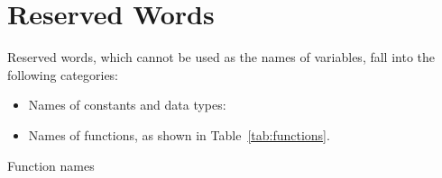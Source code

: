 \chapter{Reserved Words}
\label{reswords}

Reserved words, which cannot be used as the names of variables, fall
into the following categories:

\begin{itemize}
\item Names of constants and data types:
  

\item Names of functions, as shown in Table~\ref{tab:functions}.
\end{itemize}

\begin{table}[htbp]
\caption{Function names}
\label{tab:functions}
\begin{center}

\end{center}
\end{table}

